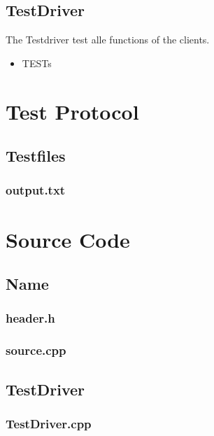 \subsection{TestDriver}
The Testdriver test alle functions of the clients.
\begin{itemize}
	\item TESTs
\end{itemize}

\newpage
\section{Test Protocol}

\subsection{Testfiles}
\subsubsection{output.txt}


\newpage
\section{Source Code}

\subsection{Name}
\subsubsection{header.h}
\subsubsection{source.cpp}
\newpage


\subsection{TestDriver}
\subsubsection{TestDriver.cpp}
\newpage

